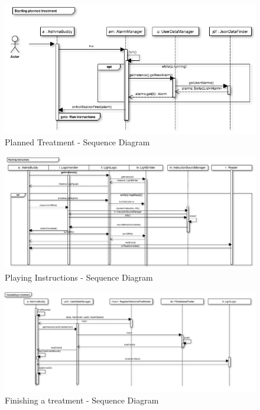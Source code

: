 \begin{figure}
	\centering
		\includegraphics[scale=0.6]{Pictures/sd/sd-planned-treatment.png}
	\caption{Planned Treatment - Sequence Diagram}
	\label{fig:ab-sd-planned-treatment}
\end{figure}

\begin{figure}
	\centering
		\includegraphics[scale=0.6]{Pictures/sd/sd-instructions.png}
	\caption{Playing Instructions - Sequence Diagram}
	\label{fig:ab-sd-instructions}
\end{figure}

\begin{figure}
	\centering
		\includegraphics[scale=0.6]{Pictures/sd/sd-complete-treatment.png}
	\caption{Finishing a treatment - Sequence Diagram}
	\label{fig:ab-sd-completing-treatment}
\end{figure}

